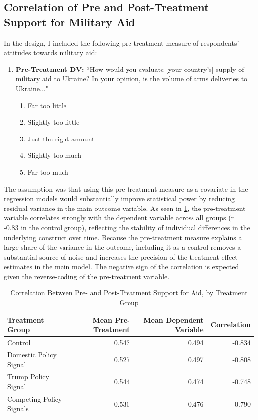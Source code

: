 \begin{appendices}
\subsection{Correlation of Pre and Post-Treatment Support for Military Aid}
In the design, I included the following pre-treatment measure of respondents' attitudes towards military aid: 
\begin{enumerate}
    \item \textbf{Pre-Treatment DV:}  ``How would you evaluate [your country's] supply of military aid to Ukraine? In your opinion, is the volume of arms deliveries to Ukraine..." 
        \begin{enumerate}
            \item Far too little
            \item Slightly too little
            \item Just the right amount
            \item Slightly too much
            \item Far too much 
        \end{enumerate}
\end{enumerate}
The assumption was that using this pre-treatment measure as a covariate in the regression models would substantially improve statistical power by reducing residual variance in the main outcome variable. As seen in \ref{tab:correlation}, the pre-treatment variable correlates strongly with the dependent variable across all groups (r = -0.83 in the control group), reflecting the stability of individual differences in the underlying construct over time. Because the pre-treatment measure explains a large share of the variance in the outcome, including it as a control removes a substantial source of noise and increases the precision of the treatment effect estimates in the main model. The negative sign of the correlation is expected given the reverse-coding of the pre-treatment variable.

\begin{table}[H]
\caption{Correlation Between Pre- and Post-Treatment Support for Aid, by Treatment Group}
\label{tab:correlation}
\centering
\begin{tabular}[t]{lrrr}
\toprule
Treatment Group & Mean Pre-Treatment & Mean Dependent Variable & Correlation\\
\midrule
Control & 0.543 & 0.494 & -0.834\\
Domestic Policy Signal & 0.527 & 0.497 & -0.808\\
Trump Policy Signal & 0.544 & 0.474 & -0.748\\
Competing Policy Signals & 0.530 & 0.476 & -0.790\\
\bottomrule
\end{tabular}
\end{table}


\end{appendices}

